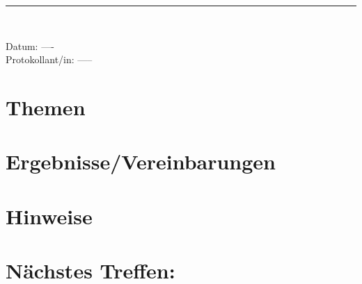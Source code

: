 \begin{center}  
\vspace{0.5pt}\nointerlineskip\rule{\textwidth}{0.2pt}\\ 
\vspace{0.5pt}\nointerlineskip
\end{center} 
\large Datum: ----\vspace{3pt}\\\large Protokollant/in: -----
\section*{Themen}
\section*{Ergebnisse/Vereinbarungen}
\section*{Hinweise}
\section*{Nächstes Treffen:}
